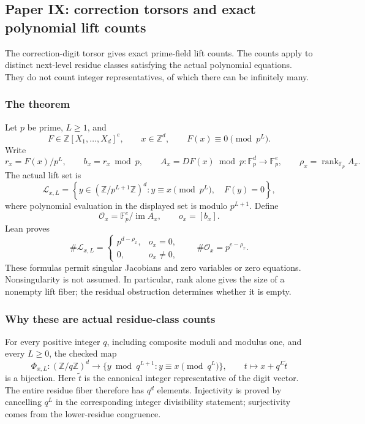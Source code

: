 \hypertarget{cont2:paper-ix-correction-torsors-and-exact-polynomial-lift-counts}{%
\subsection{Paper IX: correction torsors and exact polynomial lift
counts}\label{cont2:paper-ix-correction-torsors-and-exact-polynomial-lift-counts}}

The correction-digit torsor gives exact prime-field lift counts. The counts apply to distinct next-level
residue classes satisfying the actual polynomial equations. They do not
count integer representatives, of which there can be infinitely many.

\hypertarget{cont2:the-theorem}{%
\subsubsection{The theorem}\label{cont2:the-theorem}}

Let \(p\) be prime, \(L\ge1\), and \[
F\in\mathbb Z[X_1,\ldots,X_d]^e,
\qquad x\in\mathbb Z^d,
\qquad F(x)\equiv0\pmod{p^L}.
\] Write \[
r_x=F(x)/p^L,\qquad b_x=r_x\bmod p,
\qquad A_x=DF(x)\bmod p:\mathbb F_p^d\longrightarrow\mathbb F_p^e,
\qquad \rho_x=\operatorname{rank}_{\mathbb F_p}A_x.
\] The actual lift set is \[
\mathcal L_{x,L}=
\left\{y\in(\mathbb Z/p^{L+1}\mathbb Z)^d:
 y\equiv x\pmod{p^L},\quad F(y)=0\right\},
\] where polynomial evaluation in the displayed set is modulo
\(p^{L+1}\). Define \[
\mathcal O_x=\mathbb F_p^e/\operatorname{im}A_x,
\qquad o_x=[b_x].
\] Lean proves \[
\boxed{
\#\mathcal L_{x,L}=
\begin{cases}
p^{d-\rho_x},&o_x=0,\\
0,&o_x\ne0,
\end{cases}
\qquad
\#\mathcal O_x=p^{e-\rho_x}.
}
\] These formulas permit singular Jacobians and zero variables or zero
equations. Nonsingularity is not assumed. In particular, rank alone
gives the size of a nonempty lift fiber; the residual obstruction
determines whether it is empty.

\hypertarget{cont2:why-these-are-actual-residue-class-counts}{%
\subsubsection{Why these are actual residue-class
counts}\label{cont2:why-these-are-actual-residue-class-counts}}

For every positive integer \(q\), including composite moduli and modulus
one, and every \(L\ge0\), the checked map \[
\Phi_{x,L}:(\mathbb Z/q\mathbb Z)^d\longrightarrow
\{y\bmod q^{L+1}:y\equiv x\pmod{q^L}\},
\qquad t\longmapsto x+q^L\widetilde t
\] is a bijection. Here \(\widetilde t\) is the canonical integer
representative of the digit vector. The entire residue fiber therefore
has \(q^d\) elements. Injectivity is proved by cancelling \(q^L\) in the
corresponding integer divisibility statement; surjectivity comes from
the lower-residue congruence.

